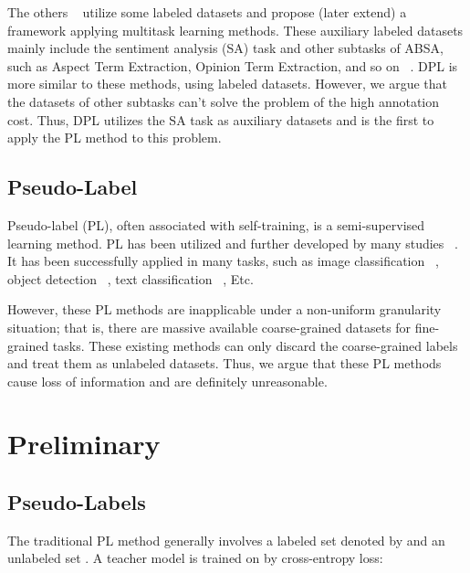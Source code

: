 \documentclass[11pt]{article}
\begin{document}
The others ~\cite{he2018exploiting,he2019interactive,chen2019transfer,liang2020iterative,yang2019multi,oh2021deep,yu2021making,yan2021unified} utilize some labeled datasets and propose (later extend) a framework applying multitask learning methods. These auxiliary labeled datasets mainly include the sentiment analysis (SA) task and other subtasks of ABSA, such as Aspect Term Extraction, Opinion Term Extraction, and so on ~\cite{yan2021unified}. 
DPL is more similar to these methods, using labeled datasets. 
However, we argue that the datasets of other subtasks can't solve the problem of the high annotation cost.
Thus, DPL utilizes the SA task as auxiliary datasets and is the first to apply the PL method to this problem.

\subsection{Pseudo-Label}
Pseudo-label (PL), often associated with self-training, is a semi-supervised learning method. PL has been utilized and further developed by many studies ~\cite{ge2020mutual,mallis2020unsupervised,zoph2020rethinking,he2019revisiting}. It has been successfully applied in many tasks, such as image classification ~\cite{pham2020meta,xie2020self}, object detection ~\cite{ge2020mutual}, text classification ~\cite{mukherjee2020uncertainty}, Etc.

However, these PL methods are inapplicable under a non-uniform granularity situation; that is, there are massive available coarse-grained datasets for fine-grained tasks. These existing methods can only discard the coarse-grained labels and treat them as unlabeled datasets. Thus, we argue that these PL methods cause loss of information and are definitely unreasonable.















\section{Preliminary}
\subsection{Pseudo-Labels}
The traditional PL method generally involves a labeled set denoted by  and an unlabeled set .
A teacher model is trained on  by cross-entropy loss:
\end{document}
